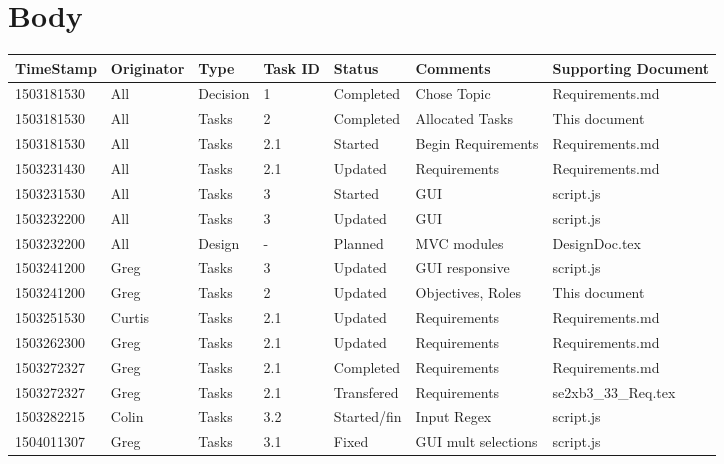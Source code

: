 \documentclass[10pt, oneside]{article}
\begin{document}

\section{Body}

\setlength{\tabcolsep}{5pt}
\begin{tabular}{|p{1.8cm}|p{1.75cm}|p{1.25cm}|p{0.8cm}|p{1.6cm}|p{3cm}|p{2.8cm}|}

	\hline
	TimeStamp & Originator & Type & Task ID & Status & Comments & Supporting Document \\
	\hline
	1503181530 & All & Decision & 1 & Completed & Chose Topic & Requirements.md \\
	\hline
	1503181530 & All & Tasks & 2 & Completed & Allocated Tasks & This document \\
	\hline
	1503181530 & All & Tasks & 2.1 & Started & Begin Requirements & Requirements.md \\
	\hline
	1503231430 & All & Tasks & 2.1 & Updated & Requirements & Requirements.md \\
	\hline
	1503231530 & All & Tasks & 3 & Started & GUI & script.js \\
	\hline
	1503232200 & All & Tasks & 3 & Updated & GUI & script.js \\
	\hline 
	1503232200 & All & Design & - & Planned & MVC modules & DesignDoc.tex \\
	\hline
	1503241200 & Greg & Tasks & 3 & Updated & GUI responsive & script.js \\
	\hline
	1503241200 & Greg & Tasks & 2 & Updated & Objectives, Roles & This document \\
	\hline
	1503251530 & Curtis & Tasks & 2.1 & Updated & Requirements & Requirements.md \\
	\hline
	1503262300 & Greg & Tasks & 2.1 & Updated & Requirements & Requirements.md \\
	\hline
	1503272327 & Greg & Tasks & 2.1 & Completed & Requirements & Requirements.md \\
	\hline
	1503272327 & Greg & Tasks & 2.1 & Transfered & Requirements & se2xb3\_33\_Req.tex \\
	\hline
	1503282215 & Colin & Tasks & 3.2 & Started/fin & Input Regex & script.js \\
	\hline
	1504011307 & Greg & Tasks & 3.1 & Fixed & GUI mult selections & script.js \\
	\hline
	
\end{tabular}
\end{document}
